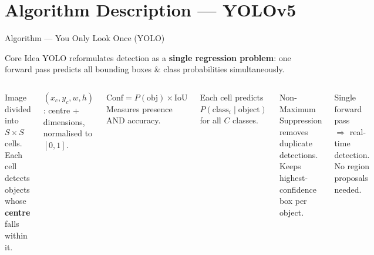 \documentclass[aspectratio=169,10pt]{beamer}
\begin{document}
\section{Algorithm Description — YOLOv5}

\begin{frame}{Algorithm — You Only Look Once (YOLO)}
  \begin{block}{Core Idea}
    YOLO reformulates detection as a \textbf{single regression problem}:
    one forward pass predicts all bounding boxes \& class probabilities simultaneously.
  \end{block}
  \vspace{4pt}
  \begin{columns}[T]
      \begin{tcolorbox}[mybox, title={Grid}]
        \footnotesize
        Image divided into $S\times S$ cells.\\
        Each cell detects objects whose \textbf{centre} falls within it.
      \end{tcolorbox}
      \vspace{3pt}
      \begin{tcolorbox}[mybox, title={Bounding Box}]
        \footnotesize
        $(x_c,y_c,w,h)$: centre + dimensions,\\
        normalised to $[0,1]$.
      \end{tcolorbox}
      \begin{tcolorbox}[mybox, title={Confidence Score}]
        \footnotesize
        $\text{Conf}=P(\text{obj})\times\mathrm{IoU}$\\[2pt]
        Measures presence AND accuracy.
      \end{tcolorbox}
      \vspace{3pt}
      \begin{tcolorbox}[mybox, title={Class Probability}]
        \footnotesize
        Each cell predicts\\
        $P(\text{class}_i\mid\text{object})$\\
        for all $C$ classes.
      \end{tcolorbox}
      \begin{tcolorbox}[mybox, title={NMS}]
        \footnotesize
        Non-Maximum Suppression removes duplicate detections.\\
        Keeps highest-confidence box per object.
      \end{tcolorbox}
      \vspace{3pt}
      \begin{tcolorbox}[greenbox, title={Speed}]
        \footnotesize
        Single forward pass\\
        $\Rightarrow$ real-time detection.\\
        No region proposals needed.
      \end{tcolorbox}
  \end{columns}
\end{frame}
\end{document}
